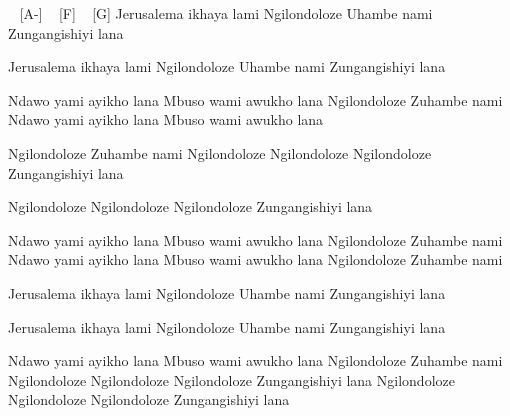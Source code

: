 

\begin{guitar}
[C] ~ [A-] ~ [F] ~ [G]
	Jerusalema ikhaya lami
Ngilondoloze
Uhambe nami
Zungangishiyi lana

Jerusalema ikhaya lami
Ngilondoloze
Uhambe nami
Zungangishiyi lana

Ndawo yami ayikho lana
Mbuso wami awukho lana
Ngilondoloze
Zuhambe nami
Ndawo yami ayikho lana
Mbuso wami awukho lana

Ngilondoloze
Zuhambe nami
Ngilondoloze
Ngilondoloze
Ngilondoloze
Zungangishiyi lana

Ngilondoloze
Ngilondoloze
Ngilondoloze
Zungangishiyi lana

Ndawo yami ayikho lana
Mbuso wami awukho lana
Ngilondoloze
Zuhambe nami
Ndawo yami ayikho lana
Mbuso wami awukho lana
Ngilondoloze
Zuhambe nami

Jerusalema ikhaya lami
Ngilondoloze
Uhambe nami
Zungangishiyi lana

Jerusalema ikhaya lami
Ngilondoloze
Uhambe nami
Zungangishiyi lana

Ndawo yami ayikho lana
Mbuso wami awukho lana
Ngilondoloze
Zuhambe nami
Ngilondoloze
Ngilondoloze
Ngilondoloze
Zungangishiyi lana
Ngilondoloze
Ngilondoloze
Ngilondoloze
Zungangishiyi lana 
\end{guitar}